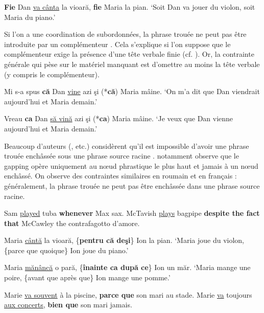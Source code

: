 \ex  \textbf{Fie} Dan \uline{va cânta} la vioară, \textbf{fie} Maria la pian. \label{ch2:ex32c}
\glt  ‘Soit Dan va jouer du violon, soit Maria du piano.’       
\z
\z

Si l’on a une coordination de subordonnées, la phrase trouée ne peut pas être introduite par un complémenteur . Cela s’explique si l’on suppose que le complémenteur exige la présence d’une tête verbale finie (cf. \citealt{Godard1989}). Or, la contrainte générale qui pèse sur le matériel manquant est d’omettre au moins la tête verbale (y compris le complémenteur). 

\ea \label{ch2:ex33}
\ea Mi s-a spus \textbf{că} Dan \uline{vine} azi şi (*\textbf{că}) Maria mâine.
\glt  ‘On m’a dit que Dan viendrait aujourd’hui et Maria demain.’   

\ex  Vreau \textbf{ca} Dan \uline{să vină} azi şi (*\textbf{ca}) Maria mâine.
\glt  ‘Je veux que Dan vienne aujourd’hui et Maria demain.’ 
\z
\z

Beaucoup d’auteurs (\citealt{Jackendoff1971,Koutsoudas1971,Hankamer1979,Wilder1994,Johnson2009}, etc.) considèrent qu’il est impossible d’avoir une phrase trouée enchâssée sous une phrase source racine . \citet{Sag1976} notamment observe que le gapping opère uniquement au nœud phrastique le plus haut et jamais à un nœud enchâssé. On observe des contraintes similaires en roumain  et en français  : généralement, la phrase trouée ne peut pas être enchâssée dans une phrase source racine.

\ea \label{ch2:ex34}
\ea  *Sam \uline{played} tuba \textbf{whenever} Max sax. \citep{Jackendoff1971}       
\ex *McTavish \uline{plays} bagpipe \textbf{despite the fact that} McCawley the contrafagotto d’amore.                  
\z
\z

\ea \label{ch2:ex35}
\ea *Maria \uline{cântă} la vioară, \{\textbf{pentru că {\textbar} deşi}\} Ion la pian.
\glt  ‘Maria joue du violon, \{parce que {\textbar} quoique\} Ion joue du piano.’   

\ex  *Maria \uline{mănâncă} o pară, \{\textbf{înainte ca {\textbar} după ce}\} Ion un măr.
\glt  ‘Maria mange une poire, \{avant que {\textbar} après que\} Ion mange une pomme.’ 
\z
\z

\ea \label{ch2:ex36}
\ea  *Marie \uline{va souvent} à la piscine, \textbf{parce que} son mari au stade.
\ex *Marie \uline{va} toujours \uline{aux concerts}, \textbf{bien que} son mari jamais.
\z
\z

